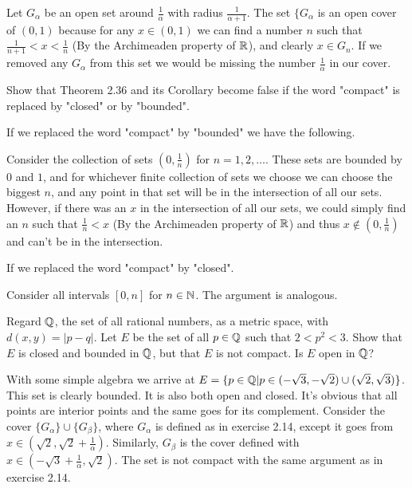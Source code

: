\begin{solution}
  Let $G_{\alpha}$ be an open set around $\frac{1}{\alpha}$ with radius $\frac{1}{\alpha + 1}$.
  The set $\{G_{\alpha}$ is an open cover of $(0, 1)$ because for any $x \in (0, 1)$ we can find a number $n$ such that $\frac{1}{n + 1} < x < \frac{1}{n}$ (By the Archimeaden property of $\mathbb{R}$), and clearly $x \in G_n$.
  If we removed any $G_{\alpha}$ from this set we would be missing the number $\frac{1}{\alpha}$ in our cover.
\end{solution}

\begin{problem}
  Show that Theorem 2.36 and its Corollary become false if the word "compact" is replaced by "closed" or by "bounded".
\end{problem}

\begin{solution}
  If we replaced the word "compact" by "bounded" we have the following.

  Consider the collection of sets $(0, \frac{1}{n})$ for $n = 1, 2, \ldots$.
  These sets are bounded by $0$ and $1$, and for whichever finite collection of sets we choose we can choose the biggest $n$, and any point in that set will be in the intersection of all our sets.
  However, if there was an $x$ in the intersection of all our sets, we could simply find an $n$ such that $\frac{1}{n} < x$ (By the Archimeaden property of $\mathbb{R}$) and thus $x \notin (0, \frac{1}{n})$ and can't be in the intersection.


  If we replaced the word "compact" by "closed".

  Consider all intervals $[0, n]$ for $n \in \mathbb{N}$.
  The argument is analogous.
\end{solution}

\begin{problem}
  Regard $\mathbb{Q}$, the set of all rational numbers, as a metric space, with $d(x, y) = |p - q|$.
  Let $E$ be the set of all $p \in \mathbb{Q}$ such that $2 < p^2 < 3$.
  Show that $E$ is closed and bounded in $\mathbb{Q}$, but that $E$ is not compact.
  Is $E$ open in $\mathbb{Q}$?
\end{problem}

\begin{solution}
  With some simple algebra we arrive at $E = \{p \in \mathbb{Q} | p \in (-\sqrt{3}, -\sqrt{2}) \cup (\sqrt{2}, \sqrt{3})\}$.
  This set is clearly bounded.
  It is also both open and closed.
  It's obvious that all points are interior points and the same goes for its complement.
  Consider the cover $\{G_{\alpha}\} \cup \{G_{\beta}\}$, where $G_{\alpha}$ is defined as in exercise 2.14, except it goes from $x \in (\sqrt{2}, \sqrt{2} + \frac{1}{\alpha})$.
  Similarly, $G_{\beta}$ is the cover defined with $x \in (-\sqrt{3} + \frac{1}{\alpha}, \sqrt{2})$.
  The set is not compact with the same argument as in exercise 2.14.
\end{solution}
